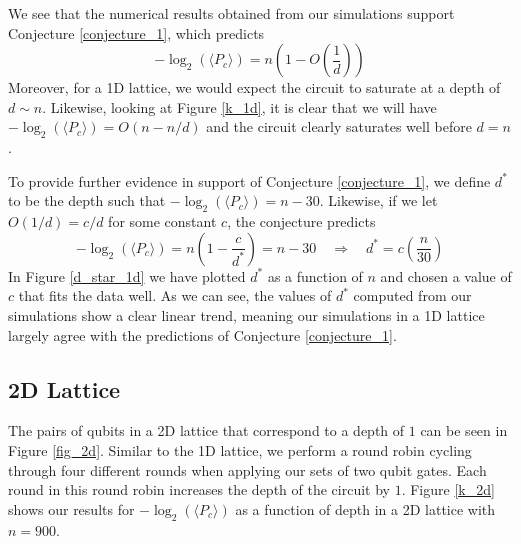 \documentclass[11pt]{article}
\theoremstyle{definition}
\theoremstyle{plain}
\begin{document}
We see that the numerical results obtained from our simulations support Conjecture {\ref{conjecture_1}}, which predicts 
\begin{equation}
-\log_2(\langle P_c \rangle) = n \left( 1 - O\left(\frac{1}{d} \right) \right) 
\end{equation}
Moreover, for a 1D lattice, we would expect the circuit to saturate at a depth of $d \sim n$. Likewise, looking at Figure {\ref{k_1d}}, it is clear that we will have $-\log_2(\langle P_c \rangle) = O(n - n/d)$ and the circuit clearly saturates well before $d = n$.

To provide further evidence in support of Conjecture {\ref{conjecture_1}}, we define $d^*$ to be the depth such that $-\log_2(\langle P_c \rangle)= n - 30$. Likewise, if we let $O(1/d) = c/d$ for some constant $c$, the conjecture predicts 
\begin{equation}
  -\log_2(\langle P_c \rangle) = n \left( 1 - \frac{c}{d^*} \right) = n - 30
  \quad \Rightarrow \quad
  d^* = c \left( \frac{n}{30} \right) 
\end{equation}
In Figure {\ref{d_star_1d}} we have plotted $d^*$ as a function of $n$ and chosen a value of $c$ that fits the data well. As we can see, the values of $d^*$ computed from our simulations show a clear linear trend, meaning our simulations in a 1D lattice largely agree with the predictions of Conjecture {\ref{conjecture_1}}. 

\subsection{2D Lattice}
The pairs of qubits in a 2D lattice that correspond to a depth of $1$ can be seen in Figure {\ref{fig_2d}}. Similar to the 1D lattice, we perform a round robin cycling through four different rounds when applying our sets of two qubit gates. Each round in this round robin increases the depth of the circuit by $1$. Figure {\ref{k_2d}} shows our results for $-\log_2(\langle P_c \rangle)$ as a function of depth in a 2D lattice with $n=900$. 
\end{document}
